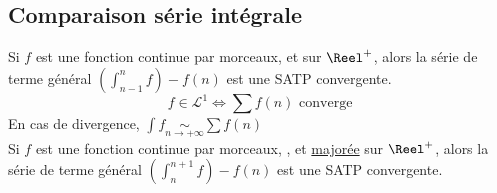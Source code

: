 \documentclass[11pt,a4paper,fleqn,pdftex]{report}
\begin{document}
\subsection{Comparaison série intégrale} %
\label{sub:comparaison_serie_integrale}
\needspace{7cm}
\begin{itheorem}
    Si $f$ est une fonction continue par morceaux,  et   sur $\Reel^+$, alors la série de terme général $\left( \int_{n-1}^n f \right) - f(n) $ est une \gls{SATP} convergente.\\
    \begin{equation}
        f \in \mathcal{L}^1 \Leftrightarrow \sum f(n) \text{ converge}
    \end{equation}
    En cas de divergence, $\int f \underset{n \to +\infty}{\sim}\sum f(n)$\\[\baselineskip]

    Si $f$ est une fonction continue par morceaux, ,  et \textcolor{couleurImp}{\uline{majorée}} sur $\Reel^+$, alors la série de terme général $\left( \int_n^{n+1} f \right) - f(n)$ est une \gls{SATP} convergente.
\end{itheorem}
\end{document}
